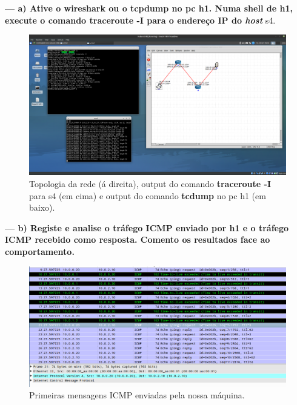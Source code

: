 \documentclass[a4paper]{article}
\begin{document}
\textbf{--- a) Ative o \textbf{wireshark} ou o \textbf{tcpdump} no pc h1. Numa \textbf{shell} de h1, execute o comando \textbf{traceroute -I} para o endereço IP do \textit{host}} s4.\newline
\begin{figure}[!htb]
    \centering
    \includegraphics[scale=0.25]{pic1.png}\newline
    \caption{Topologia da rede (á direita), output do comando \textbf{traceroute -I} para s4 (em cima) e output do comando \textbf{tcdump} no pc h1 (em baixo).}
    \label{fig:my_label}
\end{figure}

\newpage

\textbf{--- b) Registe e analise o tráfego ICMP enviado por h1 e o tráfego ICMP recebido como resposta. Comento os resultados face ao comportamento.}\newline
\begin{figure}[!h]
    \centering
    \includegraphics[scale=0.4]{parte2/2-b.png}\newline
    \caption{Primeiras mensagens ICMP enviadas pela nossa máquina.}
    \label{fig:my_label}
\end{figure}
\end{document}

